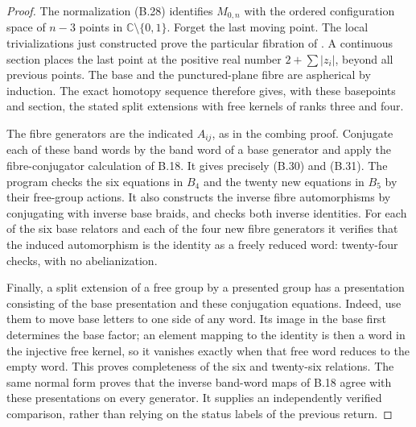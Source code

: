 \begin{proof}
The normalization (B.28) identifies $M_{0,n}$ with the ordered
configuration space of $n-3$ points in
$\mathbb C\setminus\{0,1\}$.  Forget the last moving point.
The local trivializations just constructed prove the particular
fibration of \citet[Theorem 1]{B_FadellNeuwirth}.  A continuous
section places the last point at the positive real number
$2+\sum |z_i|$, beyond all previous points.  The base and the
punctured-plane fibre are aspherical by induction.  The exact
homotopy sequence therefore gives, with these basepoints and
section, the stated split extensions with free kernels of
ranks three and four.

The fibre generators are the indicated $A_{ij}$, as in the
combing proof.  Conjugate each of these band words by the band
word of a base generator and apply the fibre-conjugator
calculation of B.18.  It gives precisely (B.30) and (B.31).
The program checks the six equations in $B_4$ and the twenty new
equations in $B_5$ by their free-group actions.  It also constructs
the inverse fibre automorphisms by conjugating with inverse base
braids, and checks both inverse identities.  For each of the six
base relators and each of the four new fibre generators it
verifies that the induced automorphism is the identity as a
freely reduced word: twenty-four checks, with no abelianization.

Finally, a split extension of a free group by a presented group
has a presentation consisting of the base presentation and these
conjugation equations.  Indeed, use them to move base letters to
one side of any word.  Its image in the base first determines the
base factor; an element mapping to the identity is then a word
in the injective free kernel, so it vanishes exactly when that
free word reduces to the empty word.  This proves completeness
of the six and twenty-six relations.  The same normal form proves
that the inverse band-word maps of B.18 agree with these
presentations on every generator.  It supplies an independently
verified comparison, rather than relying on the status labels of
the previous return.
\end{proof}
